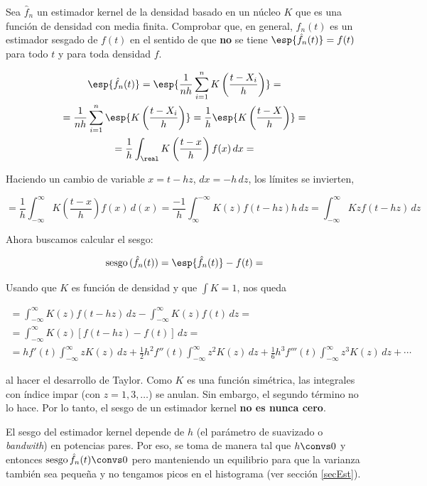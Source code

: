 \begin{problem}[8] Sea $\hat{f}_n$ un estimador kernel de la densidad basado en un núcleo $K$ que es una función de densidad con media finita. Comprobar que, en general, $\hat{f}_n(t)$ es un estimador sesgado de $f(t)$ en el sentido de que \textbf{no} se tiene $\esp{\hat{f}_n(t)} = f(t)$ para todo $t$ y para toda densidad $f$.

\solution

\begin{gather*}
\esp{\hat{f}_n(t)} = \esp{\frac{1}{nh}\sum_{i=1}^n K \left(\frac{t-X_i}{h}\right)} = \\
= \frac{1}{nh}\sum_{i=1}^n \esp{K\left(\frac{t-X_i}{h}\right)} = \frac{1}{h} \esp{K\left(\frac{t-X}{h}\right)} = \\
= \frac{1}{h} \int_\real K \left(\frac{t-x}{h}\right) f(x) \,dx = 
\end{gather*}

Haciendo un cambio de variable $x = t-hz$, $dx = -h\,dz$, los límites se invierten,

\[ = \frac{1}{h} \int_{-\infty}^\infty K \left(\frac{t-x}{h}\right) f(x) \,d(x)  = \frac{-1}{h} \int_\infty^{-\infty} K(z) f(t-hz) h \,dz  = \int_{-\infty}^\infty Kz f(t-hz)\,dz \]

Ahora buscamos calcular el sesgo:

\[ \text{sesgo}\,(\hat{f}_n(t)) = \esp{\hat{f}_n(t)} - f(t) = \]

Usando que $K$ es función de densidad y que $\int K = 1$, nos queda

\begin{gather*}
 = \int_{-\infty}^\infty K(z) f(t-hz)\,dz - \int_{-\infty}^\infty K(z) f(t)\, dz = \\
 = \int_{-\infty}^\infty K(z) \left[f(t-hz)-f(t)\right]\,dz =\\
 = hf'(t)\int_{-\infty}^\infty zK(z)\,dz + \frac{1}{2} h^2 f''(t) \int_{-\infty}^\infty z^2K(z)\,dz + \frac{1}{6}h^3 f'''(t) \int_{-\infty}^\infty z^3K(z)\,dz + \dotsb  
\end{gather*}

al hacer el desarrollo de Taylor. Como $K$ es una función simétrica, las integrales con índice impar (con $z=1, 3,\dotsc$) se anulan. Sin embargo, el segundo término no lo hace. Por lo tanto, el sesgo de un estimador kernel \textbf{no es nunca cero}. 

El sesgo del estimador kernel depende de $h$ (el parámetro de suavizado o \textit{bandwith}) en potencias pares. Por eso, se toma de manera tal que $h\convs 0$ y entonces $\text{sesgo}\,\hat{f}_n(t) \convs 0$ pero manteniendo un equilibrio para que la varianza también sea pequeña y no tengamos picos en el histograma (ver sección \ref{secEst}).

\end{problem}
